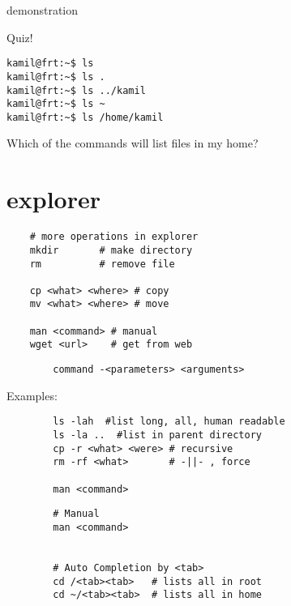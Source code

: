 \documentclass[xcolor=dvipsnames]{beamer}
\begin{document}
\begin{frame}
	\Huge
	\begin{center}
		demonstration
	\end{center}
\end{frame}

\begin{frame}[fragile]
Quiz!
\begin{verbatim}
kamil@frt:~$ ls
kamil@frt:~$ ls .
kamil@frt:~$ ls ../kamil
kamil@frt:~$ ls ~
kamil@frt:~$ ls /home/kamil
\end{verbatim}
Which of the commands will list files in my home?
\end{frame}

\section{explorer}

\begin{frame}[fragile]
\begin{verbatim}
	# more operations in explorer
	mkdir       # make directory
	rm          # remove file

	cp <what> <where> # copy
	mv <what> <where> # move

	man <command> # manual
	wget <url>    # get from web
\end{verbatim}
\end{frame}

\begin{frame}[fragile]
	\begin{verbatim}
		command -<parameters> <arguments>
	\end{verbatim}
	Examples:
	\begin{verbatim}
		ls -lah  #list long, all, human readable
		ls -la ..  #list in parent directory
		cp -r <what> <were> # recursive
		rm -rf <what>       # -||- , force

		man <command>
	\end{verbatim}
\end{frame}

\begin{frame}[fragile]
	\Large
	\begin{verbatim}
		# Manual
		man <command>


		# Auto Completion by <tab>
		cd /<tab><tab>   # lists all in root
		cd ~/<tab><tab>  # lists all in home



	\end{verbatim}
\end{frame}
\end{document}
